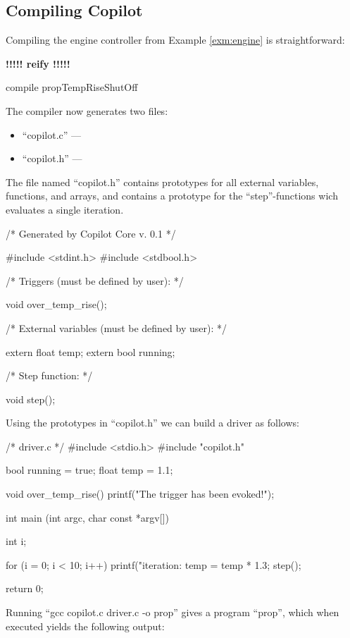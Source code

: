 \documentclass[]{article}
\newcommand{\todo}[1]{{\bf \Huge !!!!! #1 !!!!!}}
\theoremstyle{example}
\begin{document}
\subsection{Compiling Copilot}

Compiling the engine controller from Example \ref{exm:engine} is
straightforward:

\todo{reify}
%
\begin{code}
compile propTempRiseShutOff
\end{code}
%
The compiler now generates two files:

\begin{itemize}
\item ``copilot.c'' --- 
\item ``copilot.h'' --- 
\end{itemize}

The file named ``copilot.h'' contains prototypes for all external variables, functions, and arrays,
and contains a prototype for the ``step''-functions wich evaluates a single iteration.

\begin{code}
/* Generated by Copilot Core v. 0.1 */

#include <stdint.h>
#include <stdbool.h>

/* Triggers (must be defined by user): */

void over_temp_rise();

/* External variables (must be defined by user): */

extern float temp;
extern bool running;

/* Step function: */

void step();
\end{code}

Using the prototypes in ``copilot.h'' we can build a driver as follows:

\begin{code}
/* driver.c */
#include <stdio.h>
#include "copilot.h"

bool running = true;
float temp = 1.1;

void over_temp_rise()
{
  printf("The trigger has been evoked!\n");
}

int main (int argc, char const *argv[])
{
  int i;

  for (i = 0; i < 10; i++)
  {
    printf("iteration: %
    temp = temp * 1.3;
    step();
  }

  return 0;
}
\end{code}

Running ``gcc copilot.c driver.c -o prop'' gives a program ``prop'', which when executed
yields the following output:
\end{document}
